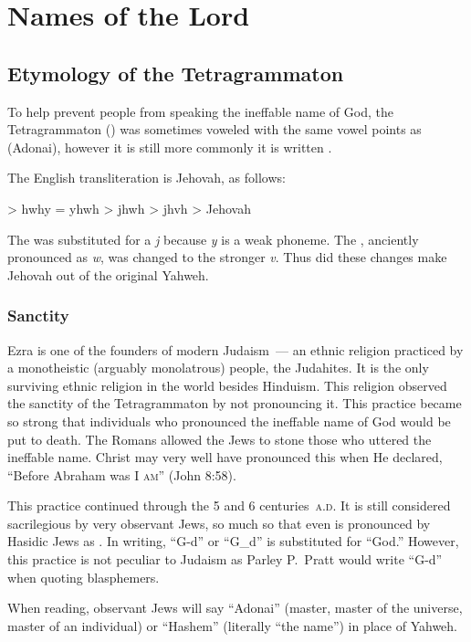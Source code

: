 \section{Names of the Lord}\label{app:names-of-the-lord}
\subsection{Etymology of the Tetragrammaton}
To help prevent people from speaking the ineffable name of God, the Tetragrammaton () was sometimes voweled with the same vowel points as  (Adonai), however it is still more commonly it is written .

The English transliteration is Jehovah, as follows:
\begin{center}
   > hwhy = yhwh > jhwh > jhvh > Jehovah
\end{center}
The  was substituted for a \textit{j} because \textit{y} is a weak phoneme. The , anciently pronounced as \textit{w}, was changed to the stronger \textit{v}. Thus did these changes make Jehovah out of the original Yahweh.

\subsubsection{Sanctity}
Ezra is one of the founders of modern Judaism~--- an ethnic religion practiced by a monotheistic (arguably monolatrous) people, the Judahites. It is the only surviving ethnic religion in the world besides Hinduism. This religion observed the sanctity of the Tetragrammaton by not pronouncing it. This practice became so strong that individuals who pronounced the ineffable name of God would be put to death. The Romans allowed the Jews to stone those who uttered the ineffable name. Christ may very well have pronounced this when He declared, ``Before Abraham was \textsc{I am}'' (John 8:58).

This practice continued through the 5 and 6 centuries~\textsc{a.d.} It is still considered sacrilegious by very observant Jews, so much so that even  is pronounced by Hasidic Jews as . In writing, ``G-d'' or ``G\_{}d'' is substituted for ``God.'' However, this practice is not peculiar to Judaism as Parley P.\ Pratt would write ``G-d'' when quoting blasphemers.

When reading, observant Jews will say ``Adonai'' (master, master of the universe, master of an individual) or ``Hashem'' (literally ``the name'') in place of Yahweh.

